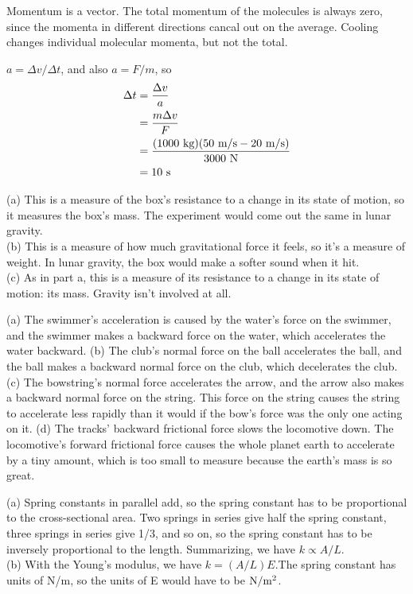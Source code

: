 Momentum is a vector. The total momentum of the
molecules is always zero, since the momenta in different
directions cancal out on the average. Cooling changes
individual molecular momenta, but not the total.

$a=\Delta v/\Delta t$, and also $a=F/m$, so
\begin{align*}
  \Delta t     &=  \frac{\Delta v}{a}  \\
               &=  \frac{m\Delta v}{F}  \\
               &=  \frac{(1000\ \kgunit)(50\ \munit/\sunit-20\ \munit/\sunit)}{3000\ \nunit}  \\
               &=  10\ \sunit
\end{align*}

(a) This is a measure of the box's resistance to a change in its state of
motion, so it measures the box's mass. The experiment would come out the same
in lunar gravity.\\
(b) This is a measure of how much gravitational force it feels, so it's a measure
of weight. In lunar gravity, the box would make a softer sound when it hit.\\
(c) As in part a, this is a measure of its resistance to a change in its state
of motion: its mass. Gravity isn't involved at all.

(a) The swimmer's acceleration is caused by the water's
force on the swimmer, and the swimmer makes a backward force
on the water, which accelerates the water backward. (b) The
club's normal force on the ball accelerates the ball, and
the ball makes a backward normal force on the club, which
decelerates the club. (c) The bowstring's normal force
accelerates the arrow, and the arrow also makes a backward
normal force on the string. This force on the string causes
the string to accelerate less rapidly than it would if the
bow's force was the only one acting on it. (d) The tracks'
backward frictional force slows the locomotive down. The
locomotive's forward frictional force causes the whole
planet earth to accelerate by a tiny amount, which is too
small to measure because the earth's mass is so great.


(a) Spring constants in parallel add, so the spring constant has to be proportional
 to the cross-sectional area. Two springs in series give half the spring constant, 
three springs in series give 1/3, and so on, so the spring constant has to be 
inversely proportional to the length. Summarizing, we have $k\propto A/L$.\\
 (b) With the
 Young's modulus, we have $k=(A/L)E$.The spring constant has units of N/m, so
 the units of E would have to be $\textup{N}/\textup{m}^2$.

